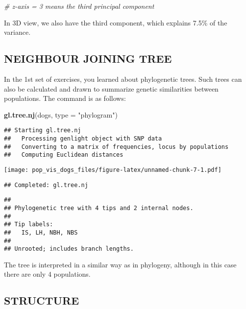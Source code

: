 \documentclass[
]{article}
\newenvironment{Shaded}{\begin{snugshade}}{\end{snugshade}}
\newcommand{\AttributeTok}[1]{\textcolor[rgb]{0.13,0.29,0.53}{#1}}
\newcommand{\CommentTok}[1]{\textcolor[rgb]{0.56,0.35,0.01}{\textit{#1}}}
\newcommand{\FunctionTok}[1]{\textcolor[rgb]{0.13,0.29,0.53}{\textbf{#1}}}
\newcommand{\NormalTok}[1]{#1}
\newcommand{\StringTok}[1]{\textcolor[rgb]{0.31,0.60,0.02}{#1}}
\begin{document}
\begin{Shaded}
\begin{Highlighting}[]
\CommentTok{\# z{-}axis = 3 means the third principal component }
\end{Highlighting}
\end{Shaded}

In 3D view, we also have the third component, which explains 7.5\% of
the variance.

\subsection{NEIGHBOUR JOINING TREE}\label{neighbour-joining-tree}

In the 1st set of exercises, you learned about phylogenetic trees. Such
trees can also be calculated and drawn to summarize genetic similarities
between populations. The command is as follows:

\begin{Shaded}
\begin{Highlighting}[]
\FunctionTok{gl.tree.nj}\NormalTok{(dogs, }\AttributeTok{type =} \StringTok{"phylogram"}\NormalTok{)}
\end{Highlighting}
\end{Shaded}

\begin{verbatim}
## Starting gl.tree.nj 
##   Processing genlight object with SNP data
##   Converting to a matrix of frequencies, locus by populations
##   Computing Euclidean distances
\end{verbatim}

\texttt{[image: pop\_vis\_dogs\_files/figure-latex/unnamed-chunk-7-1.pdf]}

\begin{verbatim}
## Completed: gl.tree.nj
\end{verbatim}

\begin{verbatim}
## 
## Phylogenetic tree with 4 tips and 2 internal nodes.
## 
## Tip labels:
##   IS, LH, NBH, NBS
## 
## Unrooted; includes branch lengths.
\end{verbatim}

The tree is interpreted in a similar way as in phylogeny, although in
this case there are only 4 populations.

\subsection{STRUCTURE}\label{structure}
\end{document}
